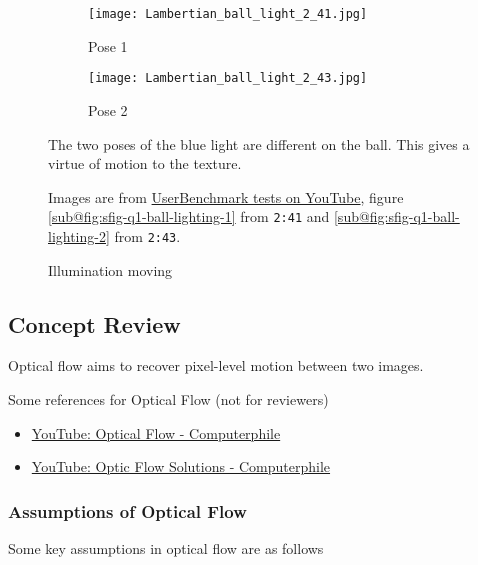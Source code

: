 \begin{figure}[h]
    \centering
    \begin{subfigure}[b]{0.25\textwidth}
        \centering
        \texttt{[image: Lambertian\_ball\_light\_2\_41.jpg]}
        \caption{Pose 1}
        \label{fig:sfig-q1-ball-lighting-1}
    \end{subfigure}
    \begin{subfigure}[b]{0.25\textwidth}
        \centering
        \texttt{[image: Lambertian\_ball\_light\_2\_43.jpg]}
        \caption{Pose 2}
        \label{fig:sfig-q1-ball-lighting-2}
    \end{subfigure}
    \caption{Illumination moving}
    \label{fig:ball-lighting-}
    \small
        The two poses of the blue light are different on the ball. This gives a virtue of motion to the texture. 
        
        Images are from \href{https://www.youtube.com/watch?v=_pK4Rkprj2Q}{UserBenchmark tests on YouTube}, figure \ref{sub@fig:sfig-q1-ball-lighting-1} from \texttt{2:41} and \ref{sub@fig:sfig-q1-ball-lighting-2} from \texttt{2:43}.
\end{figure}

\subsection{Concept Review}
\label{sec:q1-concept-review}

Optical flow aims to recover pixel-level motion between two images.

\noindent
Some references for Optical Flow (not for reviewers)

\begin{itemize}
    \item \href{https://www.youtube.com/watch?v=5AUypv5BNbI}{YouTube: Optical Flow - Computerphile}
    \item \href{https://www.youtube.com/watch?v=4v_keMNROv4}{YouTube: Optic Flow Solutions - Computerphile}
\end{itemize}

\subsubsection{Assumptions of Optical Flow}

Some key assumptions in optical flow are as follows

